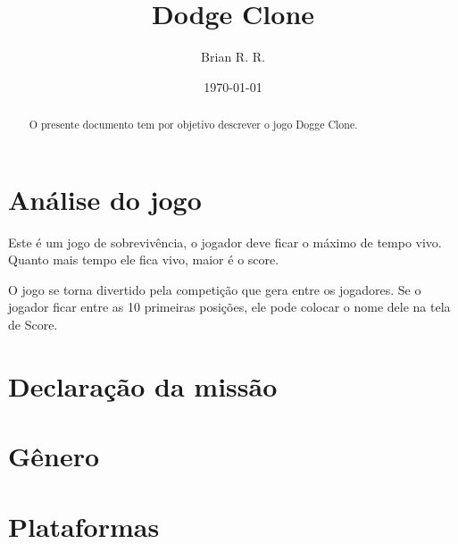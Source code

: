 \documentclass[12pt,a4paper]{article}
\title{Dodge Clone}
\author{Brian R. R.}
\date{\today}
\begin{document}
\begin{titlepage}
\maketitle
\end{titlepage}

\begin{abstract}
O presente documento tem por objetivo descrever o jogo Dogge Clone.
\end{abstract}

\tableofcontents{}

\section{Análise do jogo}


Este é um jogo de sobrevivência, o jogador deve ficar o máximo de tempo vivo.
Quanto mais tempo ele fica vivo, maior é o score.

O jogo se torna divertido pela competição que gera entre os jogadores.
Se o jogador ficar entre as 10 primeiras posições, ele pode colocar o nome dele
na tela de Score.

\section{Declaração da missão}


\section{Gênero}


\section{Plataformas}

\end{document}
